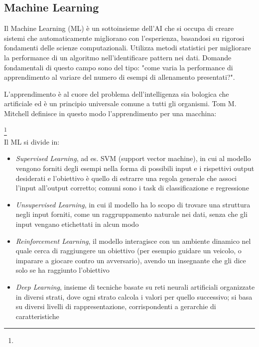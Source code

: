 \subsection{Machine Learning}

Il Machine Learning (ML) è un sottoinsieme dell'AI che si occupa di creare sistemi che automaticamente migliorano con l'esperienza, basandosi su rigorosi fondamenti delle scienze computazionali. Utilizza metodi statistici per migliorare la performance di un algoritmo nell'identificare pattern nei dati. Domande fondamentali di questo campo sono del tipo: "come varia la performance di apprendimento al variare del numero di esempi di allenamento presentati?". 

\par L'apprendimento è al cuore del problema dell'intelligenza sia bologica che artificiale ed è un principio universale comune a tutti gli organismi. Tom M. Mitchell definisce in questo modo l'apprendimento per una macchina:

\footnote{} \\

Il ML si divide in:

\begin{itemize}
	\item \textit{Supervised Learning}, ad es. SVM (support vector machine), in cui al modello vengono forniti degli esempi nella forma di possibili input e i rispettivi output desiderati e l'obiettivo è quello di estrarre una regola generale che associ l'input all'output corretto; comuni sono i task di classificazione e regressione \\
	
	\item \textit{Unsupervised Learning}, in cui il modello ha lo scopo di trovare una struttura negli input forniti, come un raggruppamento naturale nei dati, senza che gli input vengano etichettati in alcun modo \\
	
	\item \textit{Reinforcement Learning}, il modello interagisce con un ambiente dinamico nel quale cerca di raggiungere un obiettivo (per esempio guidare un veicolo, o imparare a giocare contro un avversario), avendo un insegnante che gli dice solo se ha raggiunto l'obiettivo \\
	
	\item \textit{Deep Learning}, insieme di tecniche basate su reti neurali artificiali organizzate in diversi strati, dove ogni strato calcola i valori per quello successivo; si basa su diversi livelli di rappresentazione, corrispondenti a gerarchie di caratteristiche
\end{itemize}

